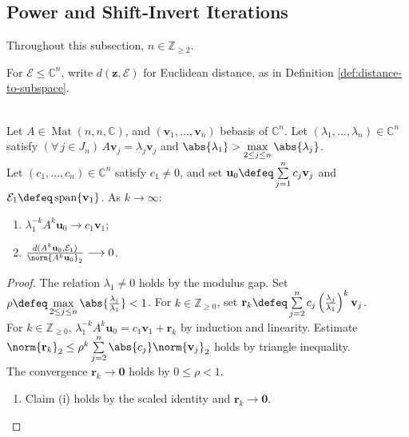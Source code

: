 \subsection{Power and Shift-Invert Iterations}

Throughout this subsection, $n\in\mathbb{Z}_{\geq2}$.

For $\mathcal{E}\leq\mathbb{C}^n$, write $d(\mathbf{z},\mathcal{E})$ for Euclidean distance, as in Definition \ref{def:distance-to-subspace}.

\begin{theorem} \label{thm:power-method-dominant-eigenvector-preview} \\
Let $A\in\operatorname{Mat}(n,n,\mathbb{C})$, and $(\mathbf{v}_1,\ldots,\mathbf{v}_n)$ bebasis of $\mathbb{C}^n$. Let $(\lambda_1,\ldots,\lambda_n)\in\mathbb{C}^n$ satisfy $(\forall\,j\in J_n)\,A\mathbf{v}_j=\lambda_j\mathbf{v}_j$ and $\abs{\lambda_1}>\max\limits_{2\leq j\leq n}\abs{\lambda_j}$.\\
Let $(c_1,\ldots,c_n)\in\mathbb{C}^n$ satisfy $c_1\neq0$, and set $\mathbf{u}_0\defeq\sum\limits_{j=1}^{n}c_j\mathbf{v}_j$ and $\mathcal{E}_1\defeq\operatorname{span}\{\mathbf{v}_1\}$. As $k\longrightarrow\infty$:
\begin{enumerate}[label=(\roman*)]
\setlength{\itemsep}{0pt}
\item $\lambda_1^{-k}A^k\mathbf{u}_0\longrightarrow c_1\mathbf{v}_1$;
\item $\frac{d(A^k\mathbf{u}_0,\mathcal{E}_1)}{\norm{A^k\mathbf{u}_0}_2}\longrightarrow0$.
\end{enumerate}
\begin{proof}
The relation $\lambda_1\neq0$ holds by the modulus gap. Set $\rho\defeq\max\limits_{2\leq j\leq n}\abs{\frac{\lambda_j}{\lambda_1}}<1$. For $k\in\mathbb{Z}_{\geq0}$, set $\mathbf{r}_k\defeq\sum\limits_{j=2}^{n}c_j\left(\frac{\lambda_j}{\lambda_1}\right)^k\mathbf{v}_j$.\\
For $k\in\mathbb{Z}_{\geq0}$, $\lambda_1^{-k}A^k\mathbf{u}_0=c_1\mathbf{v}_1+\mathbf{r}_k$ by induction and linearity. Estimate $\norm{\mathbf{r}_k}_2\leq\rho^k\sum\limits_{j=2}^{n}\abs{c_j}\norm{\mathbf{v}_j}_2$ holds by triangle inequality.\\
The convergence $\mathbf{r}_k\longrightarrow\mathbf{0}$ holds by $0\leq\rho<1$.
\begin{enumerate}[label=(\roman*)]
\setlength{\itemsep}{0pt}
\item Claim (i) holds by the scaled identity and $\mathbf{r}_k\longrightarrow\mathbf{0}$.

\end{enumerate}
\end{proof}
\end{theorem}
